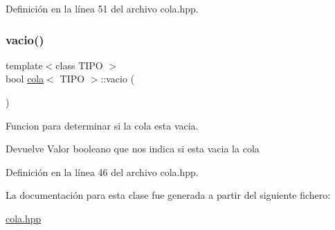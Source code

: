 Definición en la línea 51 del archivo cola.\+hpp.

\mbox{\label{classcola_a2af9a71dd856a907f446a1e396d83e5b}} 
\subsubsection{\texorpdfstring{vacio()}{vacio()}}
{\footnotesize\ttfamily template$<$class T\+I\+PO $>$ \\
bool \hyperlink{classcola}{cola}$<$ T\+I\+PO $>$\+::vacio (\begin{DoxyParamCaption}{ }\end{DoxyParamCaption})}



Funcion para determinar si la cola esta vacia. 

\begin{DoxyReturn}{Devuelve}
Valor booleano que nos indica si esta vacia la cola 
\end{DoxyReturn}


Definición en la línea 46 del archivo cola.\+hpp.



La documentación para esta clase fue generada a partir del siguiente fichero\+:\begin{DoxyCompactItemize}
\item 
\hyperlink{cola_8hpp}{cola.\+hpp}\end{DoxyCompactItemize}
